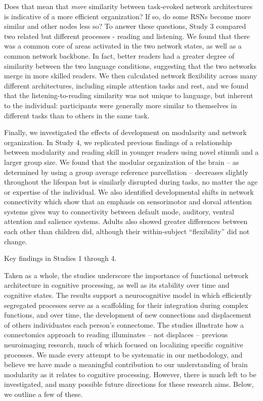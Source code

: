 Does that mean that \textit{more} similarity between task-evoked network architectures is indicative of a more efficient organization? If so, do some RSNs become more similar and other nodes less so?  To answer these questions, Study 3 compared two related but different processes - reading and listening. We found that there was a common core of areas activated in the two network states, as well as a common network backbone. In fact, better readers had a greater degree of similarity between the two language conditions, suggesting that the two networks merge in more skilled readers. We then calculated network flexibility across many different architectures, including simple attention tasks and rest, and we found that the listening-to-reading similarity was not unique to language, but inherent to the individual: participants were generally more similar to themselves in different tasks than to others in the same task.

Finally, we investigated the effects of development on modularity and network organization. In Study 4, we replicated previous findings of a relationship between modularity and reading skill in younger readers using novel stimuli and a larger group size. We found that the modular organization of the brain -- as determined by using a group average reference parcellation -- decreases slightly throughout the lifespan but is similarly disrupted during tasks, no matter the age or expertise of the individual. We also identified developmental shifts in network connectivity which show that an emphasis on sensorimotor and dorsal attention systems gives way to connectivity between default mode, auditory, ventral attention and salience systems. Adults also showed greater differences between each other than children did, although their within-subject ``flexibility'' did not change.

\begin{table}[t!]
	\renewcommand{\tabcolsep}{0.2cm}
	\centering
	
	\caption[Key findings in Studies 1 through 4]{Key findings in Studies 1 through 4.}
	\label{table:ch6-key-findings}
\end{table}

Taken as a whole, the studies underscore the importance of functional network architecture in cognitive processing, as well as its stability over time and cognitive states. The results support a neurocognitive model in which efficiently segregated processes serve as a scaffolding for their integration during complex functions, and over time, the development of new connections and displacement of others individuates each person's connectome. The studies illustrate how a connectomics approach to reading illuminates -- not displaces -- previous neuroimaging research, much of which focused on localizing specific cognitive processes. We made every attempt to be systematic in our methodology, and believe we have made a meaningful contribution to our understanding of brain modularity as it relates to cognitive processing. However, there is much left to be investigated, and many possible future directions for these research aims. Below, we outline a few of these.

